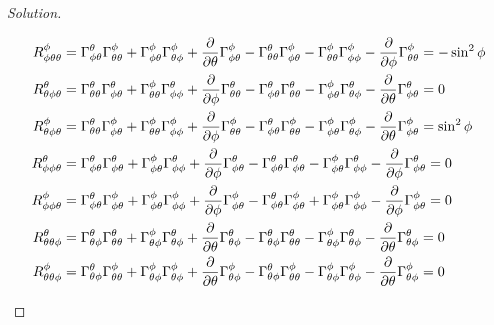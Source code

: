 \documentclass[a4paper]{article}
\begin{document}
\begin{proof}[Solution]
\begin{enumerate}[(a)]
\[\begin{aligned}
      R_{\phi \theta \theta}^\phi &= \Gamma_{\phi \theta}^\theta \Gamma_{\theta \theta}^\phi + \Gamma_{\phi \theta}^\phi \Gamma_{\theta \phi}^\phi + \pdv{\theta} \Gamma_{\phi \theta}^\phi - \Gamma_{\theta \theta}^\theta \Gamma_{\phi \theta}^\phi  - \Gamma_{\theta \theta}^\phi \Gamma_{\phi \phi}^\phi - \pdv{\phi} \Gamma_{\theta \theta}^\phi = -\sin^2 \phi \\
      R_{\theta \phi \theta}^\theta &= \Gamma_{\theta \theta}^\theta \Gamma_{\phi \theta}^\theta + \Gamma_{\theta \theta}^\phi \Gamma_{\phi \phi}^\theta + \pdv{\phi} \Gamma_{\theta \theta}^\theta - \Gamma_{\phi \theta}^\theta \Gamma_{\theta \theta}^\theta  - \Gamma_{\phi \theta}^\phi \Gamma_{\theta \phi}^\theta - \pdv{\theta} \Gamma_{\phi \theta}^\theta = 0 \\
      R_{\theta \phi \theta}^\phi &= \Gamma_{\theta \theta}^\theta \Gamma_{\phi \theta}^\phi + \Gamma_{\theta \theta}^\phi \Gamma_{\phi \phi}^\phi + \pdv{\phi} \Gamma_{\theta \theta}^\phi - \Gamma_{\phi \theta}^\theta \Gamma_{\theta \theta}^\phi  - \Gamma_{\phi \theta}^\phi \Gamma_{\theta \phi}^\phi - \pdv{\theta} \Gamma_{\phi \theta}^\phi = \sin^2 \phi \\
      R_{\phi \phi \theta}^\theta &= \Gamma_{\phi \theta}^\theta \Gamma_{\phi \theta}^\theta + \Gamma_{\phi \theta}^\phi \Gamma_{\phi \phi}^\theta + \pdv{\phi} \Gamma_{\phi \theta}^\theta - \Gamma_{\phi \theta}^\theta \Gamma_{\phi \theta}^\theta  - \Gamma_{\phi \theta}^\phi \Gamma_{\phi \phi}^\theta - \pdv{\phi} \Gamma_{\phi \theta}^\theta = 0 \\
      R_{\phi \phi \theta}^\phi &= \Gamma_{\phi \theta}^\theta \Gamma_{\phi \theta}^\phi + \Gamma_{\phi \theta}^\phi \Gamma_{\phi \phi}^\phi + \pdv{\phi} \Gamma_{\phi \theta}^\phi - \Gamma_{\phi \theta}^\theta \Gamma_{\phi \theta}^\phi  + \Gamma_{\phi \theta}^\phi \Gamma_{\phi \phi}^\phi - \pdv{\phi} \Gamma_{\phi \theta}^\phi = 0 \\
      R_{\theta \theta \phi}^\theta &= \Gamma_{\theta \phi}^\theta \Gamma_{\theta \theta}^\theta + \Gamma_{\theta \phi}^\phi \Gamma_{\theta \phi}^\theta + \pdv{\theta} \Gamma_{\theta \phi}^\theta - \Gamma_{\theta \phi}^\theta \Gamma_{\theta \theta}^\theta  - \Gamma_{\theta \phi}^\phi \Gamma_{\theta \phi}^\theta - \pdv{\theta} \Gamma_{\theta \phi}^\theta = 0 \\
      R_{\theta \theta \phi}^\phi &= \Gamma_{\theta \phi}^\theta \Gamma_{\theta \theta}^\phi + \Gamma_{\theta \phi}^\phi \Gamma_{\theta \phi}^\phi + \pdv{\theta} \Gamma_{\theta \phi}^\phi - \Gamma_{\theta \phi}^\theta \Gamma_{\theta \theta}^\phi  - \Gamma_{\theta \phi}^\phi \Gamma_{\theta \phi}^\phi - \pdv{\theta} \Gamma_{\theta \phi}^\phi = 0 \\

\end{aligned}\]
\end{enumerate}
\end{proof}
\end{document}
